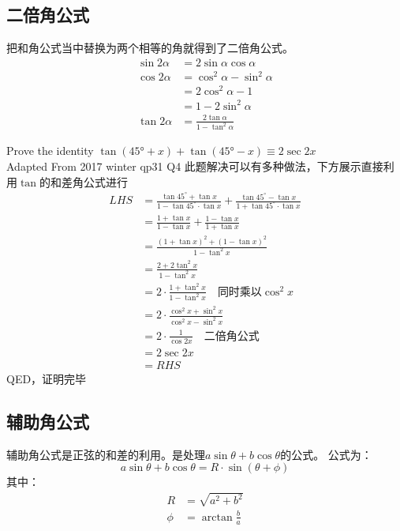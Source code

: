 \subsection*{二倍角公式}
\label{subsec:Double Angle Formula}
把和角公式当中替换为两个相等的角就得到了二倍角公式。
\begin{align*}
 \sin 2\alpha &= 2\sin \alpha \cos \alpha\\
 \cos 2\alpha &= \cos^2 \alpha -\sin^2 \alpha\\
 			  &=2\cos^2 \alpha-1\\
 			  &=1 - 2\sin^2 \alpha\\
 \tan 2\alpha &= \frac{2\tan \alpha}{1-\tan^2 \alpha}
\end{align*}


\begin{ExampleBox}
Prove the identity $\tan (45\si{\degree}+x)+\tan (45\si{\degree} -x)\equiv 2 \sec 2x$\\
\makebox{}\hfill Adapted From 2017 winter qp31 Q4
\tcblower
此题解决可以有多种做法，下方展示直接利用$\tan$的和差角公式进行
\begin{align*}
 LHS &= \frac{\tan 45^{\circ}+\tan x}{1-\tan 45^{\circ}\cdot \tan x}+\frac{\tan 45^{\circ}- \tan x}{1+\tan 45^{\circ}\cdot \tan x}\\
     &= \frac{1+\tan x}{1-\tan x}+\frac{1-\tan x}{1+\tan x}\\
     &= \frac{(1+\tan x)^2+(1-\tan x)^2}{1-\tan^2 x}\\
     &=\frac{2+2\tan^2 x}{1-\tan^2 x}\\
     &=2\cdot \frac{1+\tan^2 x}{1-\tan^2 x} \quad {\text{同时乘以$\cos^2 x$}}\\ 
     &=2\cdot \frac{\cos^2 x+\sin^2 x}{\cos^2 x-\sin^2 x}\\
     &=2 \cdot \frac{1}{\cos 2x} \quad \text{二倍角公式}\\
     &=2 \sec 2x\\
     &=RHS
\end{align*}
QED，证明完毕
\end{ExampleBox}


\subsection*{辅助角公式}
辅助角公式是正弦的和差的利用。是处理$a\sin\theta+b\cos\theta$的公式。
公式为：
\[
	a\sin\theta+b\cos\theta = R\cdot \sin(\theta+\phi)
\]
其中：
\begin{align*}
 R &= \sqrt{a^2+b^2}\\
 \phi &= \arctan \frac{b}{a}
\end{align*}

